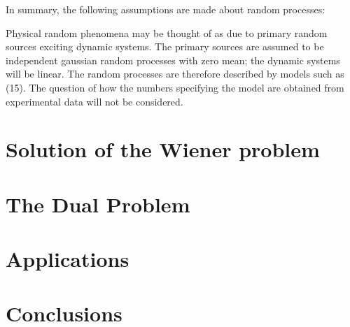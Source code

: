 \documentclass{article}
\begin{document}
In summary, the following assumptions are made about random
processes:

Physical random phenomena may be thought of as due to
primary random sources exciting dynamic systems. The primary
sources are assumed to be independent gaussian random
processes with zero mean; the dynamic systems will be linear. The
random processes are therefore described by models such as (15).
The question of how the numbers specifying the model are
obtained from experimental data will not be considered.
\section{Solution of the Wiener problem}
\section{The Dual Problem}
\section{Applications}
\section{Conclusions}
\end{document}
